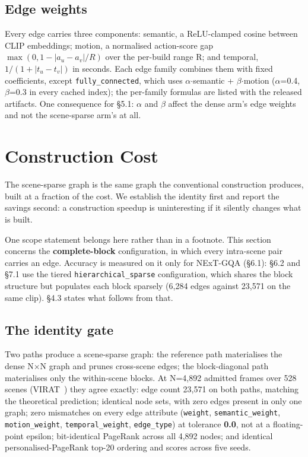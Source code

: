\documentclass[sigconf,review,anonymous]{acmart}
\begin{document}
\subsection{Edge weights}

Every edge carries three components: semantic, a ReLU-clamped cosine between CLIP embeddings;
motion, a normalised action-score gap \(\max(0, 1 - |a_u - a_v|/R)\) over the per-build range
R; and temporal, \(1/(1 + |t_u - t_v|)\) in seconds. Each edge family combines them with fixed
coefficients, except \texttt{fully\_connected}, which uses \ensuremath{\alpha}\ensuremath{\cdot}semantic + \ensuremath{\beta}\ensuremath{\cdot}motion (\ensuremath{\alpha}=0.4, \ensuremath{\beta}=0.3 in
every cached index); the per-family formulas are listed with the released artifacts. One
consequence for §5.1: \ensuremath{\alpha} and \ensuremath{\beta} affect the dense arm's edge weights and not the scene-sparse
arm's at all.

\section{Construction Cost}

The scene-sparse graph is the same graph the conventional construction produces, built at a
fraction of the cost. We establish the identity first and report the savings second: a
construction speedup is uninteresting if it silently changes what is built.

One scope statement belongs here rather than in a footnote. This section concerns the
\textbf{complete-block} configuration, in which every intra-scene pair carries an edge. Accuracy is
measured on it only for NExT-GQA (§6.1): §6.2 and §7.1 use the tiered \texttt{hierarchical\_sparse}
configuration, which shares the block structure but populates each block sparsely (6,284
edges against 23,571 on the same clip). §4.3 states what follows from that.

\subsection{The identity gate}

Two paths produce a scene-sparse graph: the reference path materialises the dense N\ensuremath{\times}N graph
and prunes cross-scene edges; the block-diagonal path materialises only the within-scene
blocks. At N=4,892 admitted frames over 528 scenes (VIRAT~\cite{oh2011virat}) they agree exactly: edge
count 23,571 on both paths, matching the theoretical prediction; identical node sets,
with zero edges present in only one graph; zero mismatches on every edge attribute
(\texttt{weight}, \texttt{semantic\_weight}, \texttt{motion\_weight}, \texttt{temporal\_weight}, \texttt{edge\_type}) at tolerance
\textbf{0.0}, not at a floating-point epsilon; bit-identical PageRank across all 4,892 nodes; and
identical personalised-PageRank top-20 ordering and scores across five seeds.
\end{document}
